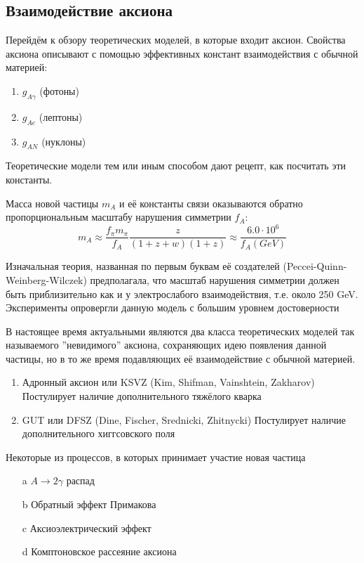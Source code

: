 \documentclass[a4paper,article,14pt]{extarticle}
\begin{document}
\subsection{Взаимодействие аксиона}

Перейдём к обзору теоретических моделей, в которые входит аксион.
Свойства аксиона описывают с помощью
эффективных констант взаимодействия с обычной материей:
\begin{enumerate}
    \item $g_{A\gamma}$ (фотоны)
    \item $g_{Ae}$ (лептоны)
    \item $g_{AN}$ (нуклоны)
\end{enumerate}
Теоретические модели тем или иным способом дают рецепт, как посчитать эти константы.

Масса новой частицы $m_A$ и её константы связи оказываются обратно пропорциональным масштабу нарушения симметрии $f_A$:
\begin{equation}
    {m_A}\approx\frac{{{f_\pi }{m_\pi }}}{{{f_A}}}\frac{z}{{\left( {1 + z + w} \right)\left( {1 + z} \right)}} \approx \frac{{6.0 \cdot {{10}^6}}}{{{f_A}\left( {GeV} \right)}}
\end{equation}


Изначальная теория, названная по первым буквам её создателей (Peccei-Quinn-Weinberg-Wilczek) предполагала, что масштаб нарушения симметрии должен быть приблизительно как и у электрослабого взаимодействия, т.е. около 250 GeV. Эксперименты опровергли данную модель с большим уровнем достоверности


В настоящее время актуальными являются два класса теоретических моделей так называемого ”невидимого” аксиона, сохраняющих идею появления данной частицы, но в то же время подавляющих её взаимодействие с обычной материей.

\begin{enumerate}
    \item  Адронный аксион или KSVZ (Kim, Shifman, Vainshtein, Zakharov) Постулирует наличие дополнительного тяжёлого кварка
    \item GUT или DFSZ (Dine, Fischer, Srednicki, Zhitnycki) Постулирует наличие дополнительного хиггсовского поля
\end{enumerate}


Некоторые из процессов, в которых принимает участие новая частица
\begin{enumerate}
    \item [a]  $A \to 2\gamma$ распад
    \item [b] Обратный эффект Примакова
    \item [c] Аксиоэлектрический эффект
    \item [d] Комптоновское рассеяние аксиона
\end{enumerate}
\end{document}
